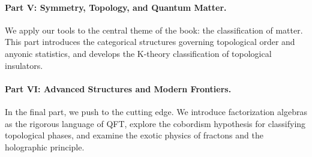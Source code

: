 \paragraph{Part V: Symmetry, Topology, and Quantum Matter.} We apply our tools to the central theme of the book: the classification of matter. This part introduces the categorical structures governing topological order and anyonic statistics, and develops the K-theory classification of topological insulators.
\paragraph{Part VI: Advanced Structures and Modern Frontiers.} In the final part, we push to the cutting edge. We introduce factorization algebras as the rigorous language of QFT, explore the cobordism hypothesis for classifying topological phases, and examine the exotic physics of fractons and the holographic principle.

